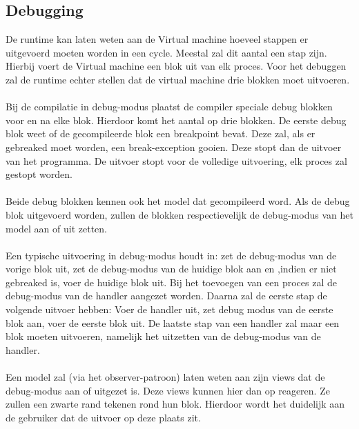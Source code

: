 \documentclass[]{article}
\begin{document}
\subsection{Debugging}
\label{Debug}
De runtime kan laten weten aan de Virtual machine hoeveel stappen er uitgevoerd moeten worden in een cycle. Meestal zal dit aantal een stap zijn. Hierbij voert de Virtual machine een blok uit van elk proces. Voor het debuggen zal de runtime echter stellen dat de virtual machine drie blokken moet uitvoeren. \\\\
Bij de compilatie in debug-modus plaatst de compiler speciale debug blokken voor en na elke blok. Hierdoor komt het aantal op drie blokken. De eerste debug blok weet of de gecompileerde blok een breakpoint bevat. Deze zal, als er gebreaked moet worden, een break-exception gooien. Deze stopt dan de uitvoer van het programma. De uitvoer stopt voor de volledige uitvoering, elk proces zal gestopt worden. \\\\
Beide debug blokken kennen ook het model dat gecompileerd word. Als de debug blok uitgevoerd worden, zullen de blokken respectievelijk de debug-modus van het model aan of uit zetten. \\\\
Een typische uitvoering in debug-modus houdt in: zet de debug-modus van de vorige blok uit, zet de debug-modus van de huidige blok aan en ,indien er niet gebreaked is, voer de huidige blok uit. Bij het toevoegen van een proces zal de debug-modus van de handler aangezet worden. Daarna zal de eerste stap de volgende uitvoer hebben: Voer de handler uit, zet debug modus van de eerste blok aan, voer de eerste blok uit. De laatste stap van een handler zal maar een blok moeten uitvoeren, namelijk het uitzetten van de debug-modus van de handler. \\\\
Een model zal (via het observer-patroon) laten weten aan zijn views dat de debug-modus aan of uitgezet is. Deze views kunnen hier dan op reageren. Ze zullen een zwarte rand tekenen rond hun blok. Hierdoor wordt het duidelijk aan de gebruiker dat de uitvoer op deze plaats zit.
\end{document}
